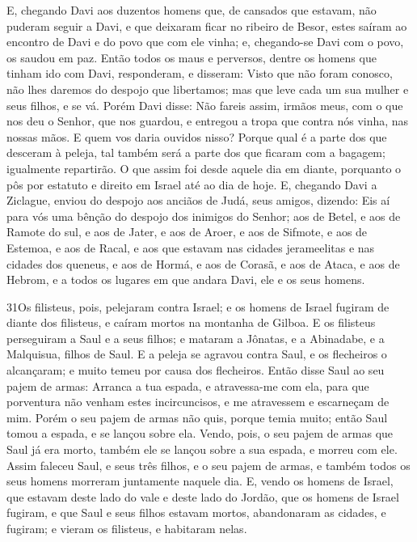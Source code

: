 E, chegando Davi aos duzentos homens que, de cansados que
estavam, não puderam seguir a Davi, e que deixaram ficar no ribeiro
de Besor, estes saíram ao encontro de Davi e do povo que com ele
vinha; e, chegando-se Davi com o povo, os saudou em paz.
Então todos os maus e perversos, dentre os homens que tinham
ido com Davi, responderam, e disseram: Visto que não foram conosco,
não lhes daremos do despojo que libertamos; mas que leve cada um sua
mulher e seus filhos, e se vá. Porém Davi disse: Não fareis
assim, irmãos meus, com o que nos deu o Senhor, que nos guardou, e
entregou a tropa que contra nós vinha, nas nossas mãos. E
quem vos daria ouvidos nisso? Porque qual é a parte dos que desceram
à peleja, tal também será a parte dos que ficaram com a bagagem;
igualmente repartirão. O que assim foi desde aquele dia em
diante, porquanto o pôs por estatuto e direito em Israel até ao dia
de hoje. E, chegando Davi a Ziclague, enviou do despojo aos
anciãos de Judá, seus amigos, dizendo: Eis aí para vós uma bênção do
despojo dos inimigos do Senhor; aos de Betel, e aos de Ramote
do sul, e aos de Jater, e aos de Aroer, e aos de Sifmote, e
aos de Estemoa, e aos de Racal, e aos que estavam nas cidades
jerameelitas e nas cidades dos queneus, e aos de Hormá, e aos
de Corasã, e aos de Ataca, e aos de Hebrom, e a todos os
lugares em que andara Davi, ele e os seus homens.

\medskip

\lettrine{31} Os filisteus, pois, pelejaram contra Israel; e
os homens de Israel fugiram de diante dos filisteus, e caíram mortos
na montanha de Gilboa. E os filisteus perseguiram a Saul e a
seus filhos; e mataram a Jônatas, e a Abinadabe, e a Malquisua,
filhos de Saul. E a peleja se agravou contra Saul, e os
flecheiros o alcançaram; e muito temeu por causa dos flecheiros.
Então disse Saul ao seu pajem de armas: Arranca a tua espada, e
atravessa-me com ela, para que porventura não venham estes
incircuncisos, e me atravessem e escarneçam de mim. Porém o seu
pajem de armas não quis, porque temia muito; então Saul tomou a
espada, e se lançou sobre ela. Vendo, pois, o seu pajem de armas
que Saul já era morto, também ele se lançou sobre a sua espada, e
morreu com ele. Assim faleceu Saul, e seus três filhos, e o seu
pajem de armas, e também todos os seus homens morreram juntamente
naquele dia. E, vendo os homens de Israel, que estavam deste
lado do vale e deste lado do Jordão, que os homens de Israel
fugiram, e que Saul e seus filhos estavam mortos, abandonaram as
cidades, e fugiram; e vieram os filisteus, e habitaram nelas.

